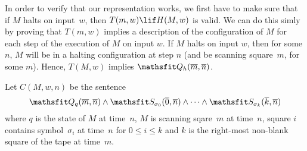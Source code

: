 \documentclass[../../include/open-logic-section]{subfiles}
\begin{document}

\begin{explain}
 In order to verify that our representation works, we first
have to make sure that if $M$ halts on input~$w$, then $T(m, w) \lif H(M,
w)$ is valid. We can do this simly by proving that $T(m, w)$ implies a
description of the configuration of $M$ for each step of the execution of
$M$ on input $w$. If $M$ halts on input $w$, then for some $n$, $M$ will be
in a halting configuration at step $n$ (and be scanning square~$m$, for
some $m$). Hence, $T(M, w)$ implies $\Obj Q_h(\overline m, \overline n)$.
\end{explain}

\begin{defn} 
Let $C(M, w, n)$ be the sentence 
\[ 
\Obj Q_q(\overline m,
\overline n) \land \Obj S_{\sigma_0}(\overline 0, \overline n) \land \dots
\land \Obj S_{\sigma_k}(\overline k, \overline n) 
\] 
where $q$ is the state
of $M$ at time~$n$, $M$ is scanning sqare~$m$ at time~$n$, square $i$
contains symbol~$\sigma_i$ at time~$n$ for $0 \le i \le k$ and $k$ is the
right-most non-blank square of the tape at time~$m$. 
\end{defn}
\end{document}
